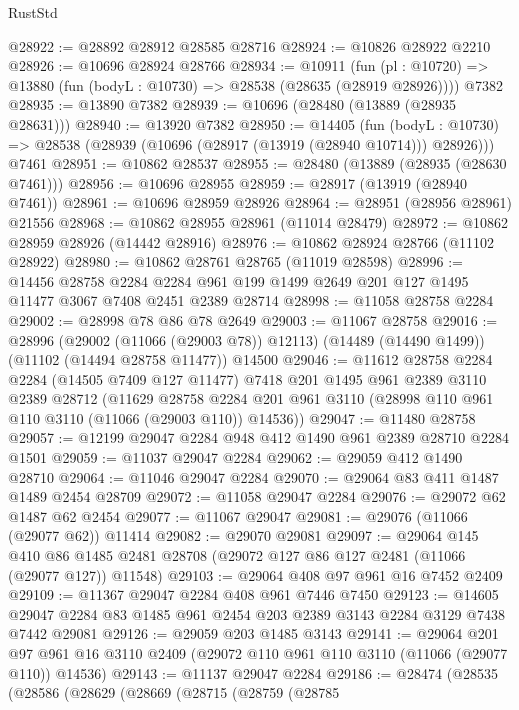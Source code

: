 \begin{lexlean}{RustStd}
\begin{coremodule}
@28922 := @28892 @28912 @28585 @28716
@28924 := @10826 @28922 @2210
@28926 := @10696 @28924 @28766
@28934 := @10911
    (fun (pl : @10720) => @13880 (fun (bodyL : @10730) => @28538 (@28635 (@28919 @28926))))
    @7382
@28935 := @13890 @7382
@28939 := @10696 (@28480 (@13889 (@28935 @28631)))
@28940 := @13920 @7382
@28950 := @14405
    (fun (bodyL : @10730) => @28538 (@28939 (@10696 (@28917 (@13919 (@28940 @10714))) @28926)))
    @7461
@28951 := @10862 @28537
@28955 := @28480 (@13889 (@28935 (@28630 @7461)))
@28956 := @10696 @28955
@28959 := @28917 (@13919 (@28940 @7461))
@28961 := @10696 @28959 @28926
@28964 := @28951 (@28956 @28961) @21556
@28968 := @10862 @28955 @28961 (@11014 @28479)
@28972 := @10862 @28959 @28926 (@14442 @28916)
@28976 := @10862 @28924 @28766 (@11102 @28922)
@28980 := @10862 @28761 @28765 (@11019 @28598)
@28996 := @14456
    @28758
    @2284
    @2284
    @961
    @199
    @1499
    @2649
    @201
    @127
    @1495
    @11477
    @3067
    @7408
    @2451
    @2389
    @28714
@28998 := @11058 @28758 @2284
@29002 := @28998 @78 @86 @78 @2649
@29003 := @11067 @28758
@29016 := @28996
    (@29002 (@11066 (@29003 @78)) @12113)
    (@14489 (@14490 @1499))
    (@11102 (@14494 @28758 @11477))
    @14500
@29046 := @11612
    @28758
    @2284
    @2284
    (@14505 @7409 @127 @11477)
    @7418
    @201
    @1495
    @961
    @2389
    @3110
    @2389
    @28712
    (@11629
      @28758
      @2284
      @201
      @961
      @3110
      (@28998 @110 @961 @110 @3110 (@11066 (@29003 @110)) @14536))
@29047 := @11480 @28758
@29057 := @12199 @29047 @2284 @948 @412 @1490 @961 @2389 @28710 @2284 @1501
@29059 := @11037 @29047 @2284
@29062 := @29059 @412 @1490 @28710
@29064 := @11046 @29047 @2284
@29070 := @29064 @83 @411 @1487 @1489 @2454 @28709
@29072 := @11058 @29047 @2284
@29076 := @29072 @62 @1487 @62 @2454
@29077 := @11067 @29047
@29081 := @29076 (@11066 (@29077 @62)) @11414
@29082 := @29070 @29081
@29097 := @29064
    @145
    @410
    @86
    @1485
    @2481
    @28708
    (@29072 @127 @86 @127 @2481 (@11066 (@29077 @127)) @11548)
@29103 := @29064 @408 @97 @961 @16 @7452 @2409
@29109 := @11367 @29047 @2284 @408 @961 @7446 @7450
@29123 := @14605 @29047 @2284 @83 @1485 @961 @2454 @203 @2389 @3143 @2284 @3129 @7438 @7442 @29081
@29126 := @29059 @203 @1485 @3143
@29141 := @29064
    @201
    @97
    @961
    @16
    @3110
    @2409
    (@29072 @110 @961 @110 @3110 (@11066 (@29077 @110)) @14536)
@29143 := @11137 @29047 @2284
@29186 := @28474
    (@28535
      (@28586
        (@28629
          (@28669
            (@28715
              (@28759
                (@28785

\end{coremodule}
\end{lexlean}
